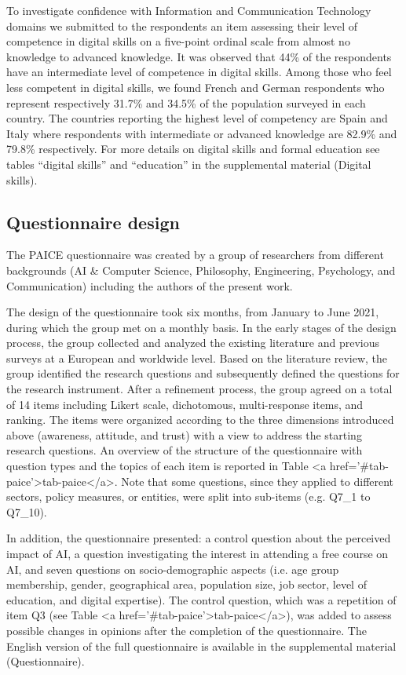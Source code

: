 \documentclass{article}
\begin{document}
To investigate confidence with Information and Communication Technology domains we submitted to the respondents an item assessing their level of competence in digital skills on a five-point ordinal scale from almost no knowledge to advanced knowledge. It was observed that 44\% of the respondents have an intermediate level of competence in digital skills. Among those who feel less competent in digital skills, we found French and German respondents who represent respectively 31.7\% and 34.5\% of the population surveyed in each country. The countries reporting the highest level of competency are Spain and Italy where respondents with intermediate or advanced knowledge are 82.9\% and 79.8\% respectively. For more details on digital skills and formal education see tables ``digital skills'' and ``education'' in the supplemental material (Digital skills).


\subsection{Questionnaire design}
The PAICE questionnaire was created
by a group of researchers from different backgrounds (AI \& Computer Science, Philosophy, Engineering, Psychology, and Communication) including the authors of the present work. 

The design of the questionnaire took six months, from January to June 2021, during which the group met on a monthly basis. In the early stages of the design process, the group collected and analyzed the existing literature and previous surveys at a European and worldwide level. Based on the literature review, the group identified the research questions and subsequently defined the questions for the research instrument. 
After a refinement process, the group agreed on a total of 14 items including Likert scale, dichotomous, multi-response items, and ranking. The items were organized according to the three dimensions introduced above (awareness, attitude, and trust) with a view to address the starting research questions. An overview of the structure of the questionnaire with question types and the topics of each item is reported in Table <a href='#tab-paice'>tab-paice</a>. 
Note that some questions, since they applied to different sectors, policy measures, or entities, were split into sub-items (e.g. Q7\_1 to Q7\_10). 

In addition, the questionnaire presented: a control question about the perceived impact of AI, a question investigating the interest in attending a free course on AI, and seven questions on socio-demographic aspects (i.e. age group membership, gender, geographical area, population size, job sector, level of education, and digital expertise). The control question, which was a repetition of item Q3 (see Table <a href='#tab-paice'>tab-paice</a>), was added to assess possible changes in opinions after the completion of the questionnaire. The English version of the full questionnaire is available in the supplemental material (Questionnaire). 
\end{document}
